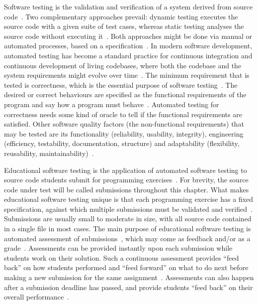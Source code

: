\documentclass[../main]{subfiles}
\begin{document}
Software testing is the validation and verification of a system derived from source code~\autocite{ammannIntroductionSoftwareTesting2016}.
Two complementary approaches prevail: dynamic testing executes the source code with a given suite of test cases, whereas static testing analyses the source code without executing it~\autocite{romliAutomaticProgrammingAssessment2010}.
Both approaches might be done via manual or automated processes, based on a specification~\autocite{pieterseAutomatedAssessmentProgramming2013}.
In modern software development, automated testing has become a standard practice for continuous integration and continuous development of living codebases, where both the codebase and the system requirements might evolve over time~\autocite{wintersSoftwareEngineeringGoogle2020}.
The minimum requirement that is tested is correctness, which is the essential purpose of software testing~\autocite{panSoftwareTesting1999}.
The desired or correct behaviours are specified as the functional requirements of the program and say how a program must behave~\autocite{bassSoftwareArchitecturePractice2021}.
Automated testing for correctness needs some kind of oracle to tell if the functional requirements are satisfied.
Other software quality factors (the non-functional requirements) that may be tested are its functionality (reliability, usability, integrity), engineering (efficiency, testability, documentation, structure) and adaptability (flexibility, reusability, maintainability)~\autocite{hetzelCompleteGuideSoftware1988}.

Educational software testing is the application of automated software testing to source code students submit for programming exercises~\autocite{staubitzRepositoryOpenAutogradable2017,paivaAutomatedAssessmentComputer2022,desouzaSystematicLiteratureReview2016,keuningSystematicLiteratureReview2018}.
For brevity, the source code under test will be called submissions throughout this chapter.
What makes educational software testing unique is that each programming exercise has a fixed specification, against which multiple submissions must be validated and verified~\autocite{wilcoxTestingStrategiesAutomated2016}.
Submissions are usually small to moderate in size, with all source code contained in a single file in most cases.
The main purpose of educational software testing is automated assessment of submissions~\autocite{berssanetteActiveLearningContext2021}, which may come as feedback and/or as a grade~\autocite{caizaProgrammingAssignmentsAutomatic2013}.
Assessments can be provided instantly upon each submission while students work on their solution.
Such a continuous assessment provides ``feed back'' on how students performed and ``feed forward'' on what to do next before making a new submission for the same assignment~\autocite{cheangAutomatedGradingProgramming2003,higginsCourseMarkerCBASystem2003,luckSecureOnlineSubmission1999}.
Assessments can also happen after a submission deadline has passed, and provide students ``feed back'' on their overall performance~\autocite{hattiePowerFeedback2007,timmisRethinkingAssessmentDigital2016}.
\end{document}
